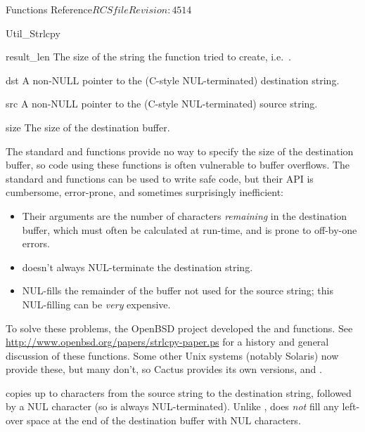 \begin{cactuspart}{ Functions Reference}{$RCSfile$}{$Revision: 4514 $}
\begin{FunctionDescription}{Util\_Strlcpy}
\begin{ResultSection}
\begin{Result}{result\_len}
The size of the string the function tried to create, i.e.\
.
\end{Result}
\end{ResultSection}

\begin{ParameterSection}
\begin{Parameter}{dst}
A non-NULL pointer to the (C-style NUL-terminated) destination string.
\end{Parameter}
\begin{Parameter}{src}
A non-NULL pointer to the (C-style NUL-terminated) source string.
\end{Parameter}
\begin{Parameter}{size}
The size of the destination buffer.
\end{Parameter}
\end{ParameterSection}

\begin{Discussion}
The standard  and  functions provide
no way to specify the size of the destination buffer, so code using
these functions is often vulnerable to buffer overflows.  The standard
\code{strncat()} and \code{strncpy()} functions can be used to write
safe code, but their API is cumbersome, error-prone, and sometimes
surprisingly inefficient:
\begin{itemize}
\item	Their  arguments are the number of characters
	{\em remaining\/} in the destination buffer, which must
	often be calculated at run-time, and is prone to off-by-one
	errors.
\item	{} doesn't always NUL-terminate the destination string.
\item	\code{strncpy()} NUL-fills the remainder of the buffer not
	used for the source string; this NUL-filling can be {\em very\/}
	expensive.
\end{itemize}

To solve these problems, the OpenBSD project developed the
 and  functions.  See
\url{http://www.openbsd.org/papers/strlcpy-paper.ps}
for a history and general discussion of these functions.
Some other Unix systems (notably Solaris) now provide these,
but many don't, so Cactus provides its own versions,
 and .

 copies up to  characters from the
source string to the destination string, followed by a NUL character
(so \code{dst} is always NUL-terminated).  Unlike \code{strncpy()},
\code{Util\_Strlcpy()} does {\em not\/} fill any left-over space at
the end of the destination buffer with NUL characters.
\end{Discussion}


\end{FunctionDescription}
\end{cactuspart}
